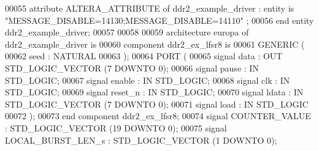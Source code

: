 \begin{DoxyCode}
00055 \textcolor{keywordflow}{attribute} \textcolor{vhdlchar}{ALTERA_ATTRIBUTE} \textcolor{keywordflow}{of} \textcolor{vhdlchar}{ddr2\_example\_driver} \textcolor{vhdlchar}{:} \textcolor{keywordflow}{entity} \textcolor{keywordflow}{is} \textcolor{keyword}{"MESSAGE\_DISABLE=14130;MESSAGE\_DISABLE=14110"}
      ;
00056 \textcolor{keywordflow}{end} \textcolor{keywordflow}{entity} \textcolor{vhdlchar}{ddr2\_example\_driver};
00057 
00058 
00059 \textcolor{keywordflow}{architecture} europa \textcolor{keywordflow}{of} ddr2_example_driver is
00060   \textcolor{keywordflow}{component} ddr2_ex_lfsr8 \textcolor{keywordflow}{is}
00061 \textcolor{keywordflow}{GENERIC} (
00062       seed : \textcolor{comment}{NATURAL}
00063       );
00064     \textcolor{keywordflow}{PORT} (
00065     \textcolor{keywordflow}{signal} data : \textcolor{keywordflow}{OUT} \textcolor{comment}{STD\_LOGIC\_VECTOR} (\textcolor{vhdllogic}{}\textcolor{vhdllogic}{7} \textcolor{keywordflow}{DOWNTO} \textcolor{vhdllogic}{}\textcolor{vhdllogic}{0});
00066         \textcolor{keywordflow}{signal} pause : \textcolor{keywordflow}{IN} \textcolor{comment}{STD\_LOGIC};
00067         \textcolor{keywordflow}{signal} enable : \textcolor{keywordflow}{IN} \textcolor{comment}{STD\_LOGIC};
00068         \textcolor{keywordflow}{signal} clk : \textcolor{keywordflow}{IN} \textcolor{comment}{STD\_LOGIC};
00069         \textcolor{keywordflow}{signal} reset_n : \textcolor{keywordflow}{IN} \textcolor{comment}{STD\_LOGIC};
00070         \textcolor{keywordflow}{signal} ldata : \textcolor{keywordflow}{IN} \textcolor{comment}{STD\_LOGIC\_VECTOR} (\textcolor{vhdllogic}{}\textcolor{vhdllogic}{7} \textcolor{keywordflow}{DOWNTO} \textcolor{vhdllogic}{}\textcolor{vhdllogic}{0});
00071         \textcolor{keywordflow}{signal} load : \textcolor{keywordflow}{IN} \textcolor{comment}{STD\_LOGIC}
00072       );
00073   \textcolor{keywordflow}{end} \textcolor{keywordflow}{component} \textcolor{vhdlchar}{ddr2_ex_lfsr8};
00074                 \textcolor{keywordflow}{signal} \textcolor{vhdlchar}{COUNTER_VALUE} \textcolor{vhdlchar}{:}  \textcolor{comment}{STD\_LOGIC\_VECTOR} \textcolor{vhdlchar}{(}\textcolor{vhdllogic}{}\textcolor{vhdllogic}{19} \textcolor{keywordflow}{DOWNTO} \textcolor{vhdllogic}{}\textcolor{vhdllogic}{0}\textcolor{vhdlchar}{)};
00075                 \textcolor{keywordflow}{signal} \textcolor{vhdlchar}{LOCAL_BURST_LEN_s} \textcolor{vhdlchar}{:}  \textcolor{comment}{STD\_LOGIC\_VECTOR} \textcolor{vhdlchar}{(}\textcolor{vhdllogic}{}\textcolor{vhdllogic}{1} \textcolor{keywordflow}{DOWNTO} \textcolor{vhdllogic}{}\textcolor{vhdllogic}{0}\textcolor{vhdlchar}{)};

\end{DoxyCode}
